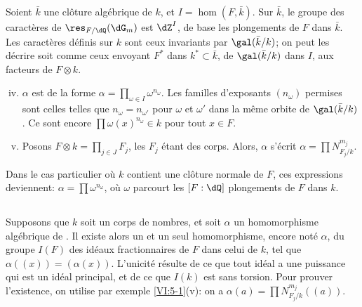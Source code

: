Soient $\bar k$ une clôture algébrique de $k$, et $I=\hom(F,\bar k)$. Sur 
$\bar k$, le groupe des caractères de $\res_{F/\dQ}(\dG_m)$ est $\dZ^I$, de 
base les plongements de $F$ dans $\bar k$. Les caractères définis sur $k$ 
sont ceux invariants par $\gal(\bar k/k)$; on peut les décrire soit comme 
ceux envoyant $F^\ast$ dans $k^\ast\subset \bar k$,  de $\gal(\bar k/k)$ dans $I$,  aux facteurs de 
$F\otimes k$. 
\begin{enumerate}[(i)]
\setcounter{enumi}{3}
  \item $\alpha$ est de la forme 
    $\alpha=\prod_{\omega\in I} \omega^{n_\omega}$. Les familles d'exposants 
    $(n_\omega)$ permises sont celles telles que $n_\omega=n_{\omega'}$ pour 
    $\omega$ et $\omega'$ dans la même orbite de $\gal(\bar k/k)$. Ce sont 
    encore  $\prod \omega(x)^{n_\omega}\in k$ pour tout 
    $x\in F$. 
\item Posons $F\otimes k=\prod_{j\in J} F_j$, les $F_j$ étant des corps. 
    Alors, $\alpha$ s'écrit $\alpha=\prod N_{F_j/k}^{m_j}$. 
\end{enumerate}

Dans le cas particulier où $k$ contient une clôture normale de $F$, ces 
expressions deviennent: $\alpha=\prod \omega^{n_\omega}$, où $\omega$ 
parcourt les $[F:\dQ]$ plongements de $F$ dans $k$. 





\subsection{}\label{VI:5-2}

Supposons que $k$ soit un corps de nombres, et soit $\alpha$ un homomorphisme 
algébrique de . Il existe alors un et un seul 
homomorphisme, encore noté $\alpha$, du groupe $I(F)$ des idéaux 
fractionnaires de $F$ dans celui de $k$, tel que $\alpha((x))=(\alpha(x))$. 
L'unicité résulte de ce que tout idéal a une puissance qui est un 
idéal principal, et de ce que $I(k)$ est sans torsion. Pour prouver 
l'existence, on utilise par exemple \ref{VI:5-1}(v): on a 
$\alpha(a) = \prod N_{F_j/k}^{m_j}((a))$. 





